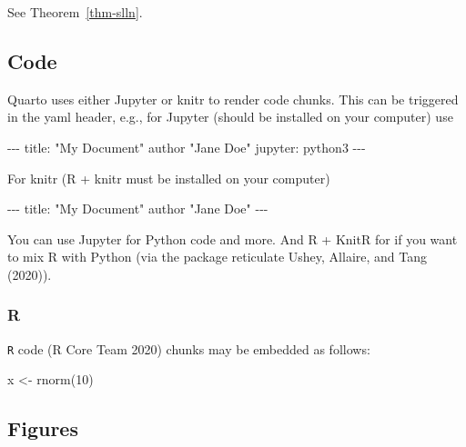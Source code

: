 \documentclass[
  11pt,
  a4paper,
]{article}
\newenvironment{Shaded}{}{}
\newcommand{\AttributeTok}[1]{\textcolor[rgb]{0.84,0.23,0.29}{#1}}
\newcommand{\DecValTok}[1]{\textcolor[rgb]{0.00,0.36,0.77}{#1}}
\newcommand{\FunctionTok}[1]{\textcolor[rgb]{0.44,0.26,0.76}{#1}}
\newcommand{\KeywordTok}[1]{\textcolor[rgb]{0.84,0.23,0.29}{#1}}
\newcommand{\NormalTok}[1]{\textcolor[rgb]{0.14,0.16,0.18}{#1}}
\newcommand{\OtherTok}[1]{\textcolor[rgb]{0.44,0.26,0.76}{#1}}
\newcommand{\PreprocessorTok}[1]{\textcolor[rgb]{0.84,0.23,0.29}{#1}}
\newcommand{\StringTok}[1]{\textcolor[rgb]{0.01,0.18,0.38}{#1}}
\theoremstyle{plain}
\theoremstyle{remark}
\begin{document}
See Theorem~\ref{thm-slln}.

\hypertarget{code}{%
\subsection{Code}\label{code}}

Quarto uses either Jupyter or knitr to render code chunks. This can be
triggered in the yaml header, e.g., for Jupyter (should be installed on
your computer) use

\begin{Shaded}
\begin{Highlighting}[]
\PreprocessorTok{{-}{-}{-}}
\FunctionTok{title}\KeywordTok{:}\AttributeTok{ }\StringTok{"My Document"}
\AttributeTok{author "Jane Doe"}
\FunctionTok{jupyter}\KeywordTok{:}\AttributeTok{ python3}
\PreprocessorTok{{-}{-}{-}}
\end{Highlighting}
\end{Shaded}

For knitr (R + knitr must be installed on your computer)

\begin{Shaded}
\begin{Highlighting}[]
\PreprocessorTok{{-}{-}{-}}
\FunctionTok{title}\KeywordTok{:}\AttributeTok{ }\StringTok{"My Document"}
\AttributeTok{author "Jane Doe"}
\PreprocessorTok{{-}{-}{-}}
\end{Highlighting}
\end{Shaded}

You can use Jupyter for Python code and more. And R + KnitR for if you
want to mix R with Python (via the package reticulate Ushey, Allaire,
and Tang (2020)).

\hypertarget{r}{%
\subsubsection{R}\label{r}}

\texttt{R} code (R Core Team 2020) chunks may be embedded as follows:

\begin{Shaded}
\begin{Highlighting}[]
\NormalTok{x }\OtherTok{\textless{}{-}} \FunctionTok{rnorm}\NormalTok{(}\DecValTok{10}\NormalTok{)}
\end{Highlighting}
\end{Shaded}

\hypertarget{figures}{%
\subsection{Figures}\label{figures}}
\end{document}
